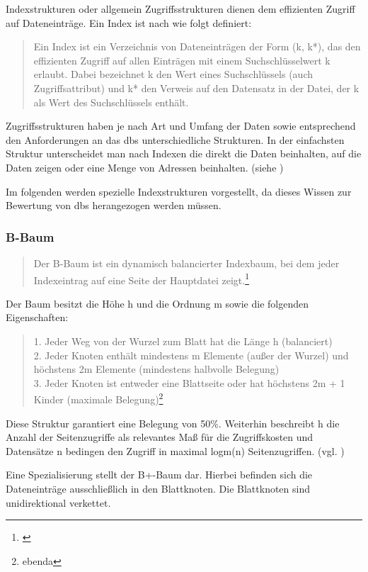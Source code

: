 Indexstrukturen oder allgemein Zugriffsstrukturen dienen dem effizienten Zugriff auf Dateneinträge.
Ein Index ist nach \cite[S.284]{book:kudrass} wie folgt definiert:
\begin{quote}
Ein Index ist ein Verzeichnis von Dateneinträgen der Form (k, k*), das den effizienten Zugriff auf allen Einträgen mit einem Suchschlüsselwert k erlaubt. Dabei bezeichnet k den Wert eines Suchschlüssels (auch Zugriffsattribut) und k* den Verweis auf den Datensatz in der Datei, der k als Wert des Suchschlüssels enthält.
\end{quote}
Zugriffsstrukturen haben je nach Art und Umfang der Daten sowie entsprechend den Anforderungen an das \Gls{dbs} unterschiedliche Strukturen.
In der einfachsten Struktur unterscheidet man nach Indexen die direkt die Daten beinhalten, auf die Daten zeigen oder eine Menge von Adressen beinhalten. (siehe \cite[S.284]{book:kudrass})

Im folgenden werden spezielle Indexstrukturen vorgestellt, da dieses Wissen zur Bewertung von \Gls{dbs} herangezogen werden müssen.

\subsubsection{B-Baum}

\begin{quote}
Der B-Baum ist ein dynamisch balancierter Indexbaum, bei dem jeder Indexeintrag auf eine Seite der Hauptdatei zeigt.\footnote{\cite[S.288]{book:kudrass}}
\end{quote}
Der Baum besitzt die Höhe h und die Ordnung m sowie die folgenden Eigenschaften:
\begin{quote}
1. Jeder Weg von der Wurzel zum Blatt hat die Länge h (balanciert)\\
2. Jeder Knoten enthält mindestens m Elemente (außer der Wurzel) und  höchstens 2m Elemente (mindestens halbvolle Belegung)\\
3. Jeder Knoten ist entweder eine Blattseite oder hat höchstens 2m + 1 Kinder (maximale Belegung)\footnote{ebenda}
\end{quote}
Diese Struktur garantiert eine Belegung von 50\%.
Weiterhin beschreibt h die Anzahl der Seitenzugriffe als relevantes Maß für die Zugriffskosten und Datensätze n bedingen den Zugriff in maximal logm(n) Seitenzugriffen. (vgl. \cite[S.288]{book:kudrass})

Eine Spezialisierung stellt der B+-Baum dar.
Hierbei befinden sich die Dateneinträge ausschließlich in den Blattknoten.
Die Blattknoten sind unidirektional verkettet.


